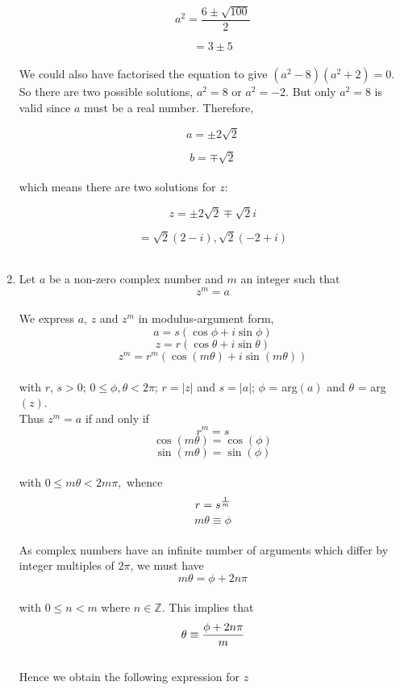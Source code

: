 \documentclass[12pt]{amsart}
\begin{document}
\begin{enumerate}
		\begin{equation*}
			a^2=\frac{6\pm \sqrt{100}}{2}
		\end{equation*}
		
		\smallskip
		
		\begin{equation*}
			=3\pm5
		\end{equation*}
		\\
		We could also have factorised the equation to give $(a^2-8)(a^2+2)=0$. So there are two possible
		solutions, $a^2=8$ or $a^2=-2$.  But only $a^2=8$ is valid since $a$ must be a real number.  
		Therefore,
		
		\begin{equation*}
			a=\pm 2\sqrt{2}
		\end{equation*}
		
		\begin{equation*}
			b=\mp \sqrt{2}
		\end{equation*}
		\\
		which means there are two solutions for $z$:
		
		\begin{equation*}
			z=\pm 2\sqrt{2}\mp \sqrt{2}i
		\end{equation*}
		
		$$=\sqrt{2}(2-i), \sqrt{2}(-2+i)$$
		\\
		
	\item
		Let $a$ be a non-zero complex number and $m$ an integer such that \\
		$$z^m=a$$ \\ 
		We express $a$, $z$ and $z^m$ in modulus-argument form, \\
		$$a=s(\cos \phi + i \sin \phi)$$
		$$z=r(\cos \theta + i \sin \theta)$$
		$$z^m=r^m(\cos(m \theta)+i\sin(m \theta))$$
		\\
		with $r$, $s > 0$; $0 \le \phi, \theta < 2\pi$; $r=|z|$ and $s=|a|$; $\phi$ = arg$(a)$ and 
		$\theta$ =  arg$(z)$.
		\\
		Thus $z^m=a$ if and only if\\
		$$r^m=s$$
		$$\cos(m\theta)=\cos(\phi)$$
		$$\sin(m\theta)=\sin(\phi)$$\\
		with $0 \le m\theta < 2m\pi,$ whence\\
		$$r=s^{1\over m}$$
		$$m \theta \equiv \phi$$\\	
		As complex numbers have an infinite number of arguments which differ by integer multiples of 
		$2\pi$, we must have\\
		$$m \theta = \phi + 2n \pi$$\\
		with $0 \le n < m$ where $n \in \mathbb{Z}.$  This implies that\\
		$$\theta \equiv {\phi+ 2n\pi \over m}$$\\
		Hence we obtain the following expression for $z$\\
		

\end{enumerate}
\end{document}

